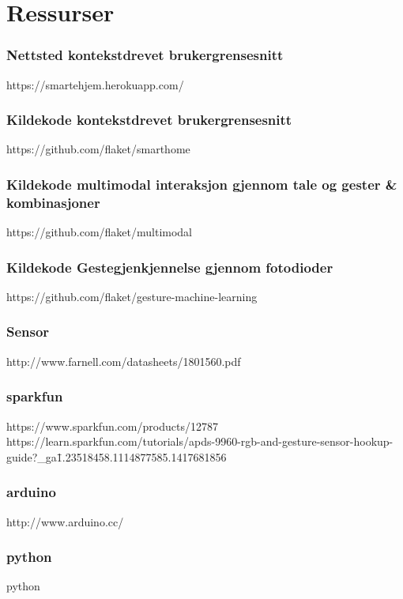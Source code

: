 \section{Ressurser}
\subsubsection*{Nettsted kontekstdrevet brukergrensesnitt}
https://smartehjem.herokuapp.com/

\subsubsection*{Kildekode kontekstdrevet brukergrensesnitt}
https://github.com/flaket/smarthome

\subsubsection*{Kildekode multimodal interaksjon gjennom tale og gester \& kombinasjoner}
https://github.com/flaket/multimodal

\subsubsection*{Kildekode Gestegjenkjennelse gjennom fotodioder}
https://github.com/flaket/gesture-machine-learning

\subsubsection*{Sensor}
http://www.farnell.com/datasheets/1801560.pdf

\subsubsection*{sparkfun}
https://www.sparkfun.com/products/12787
https://learn.sparkfun.com/tutorials/apds-9960-rgb-and-gesture-sensor-hookup-guide?\_ga\=1.23518458.1114877585.1417681856

\subsubsection*{arduino}
http://www.arduino.cc/

\subsubsection*{python}
python

